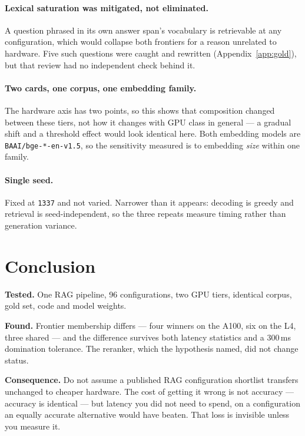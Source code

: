 \paragraph{Lexical saturation was mitigated, not eliminated.} A question phrased
in its own answer span's vocabulary is retrievable at any configuration, which
would collapse both frontiers for a reason unrelated to hardware. Five such
questions were caught and rewritten (Appendix~\ref{app:gold}), but that review
had no independent check behind it.

\paragraph{Two cards, one corpus, one embedding family.} The hardware axis has
two points, so this shows that composition changed between these tiers, not how
it changes with GPU class in general --- a gradual shift and a threshold effect
would look identical here. Both embedding models are \texttt{BAAI/bge-*-en-v1.5},
so the sensitivity measured is to embedding \emph{size} within one family.

\paragraph{Single seed.} Fixed at \texttt{1337} and not varied. Narrower than it
appears: decoding is greedy and retrieval is seed-independent, so the three
repeats measure timing rather than generation variance.

\section{Conclusion}

\textbf{Tested.} One RAG pipeline, 96 configurations, two GPU tiers, identical
corpus, gold set, code and model weights.

\textbf{Found.} Frontier membership differs --- four winners on the A100, six on
the L4, three shared --- and the difference survives both latency statistics and
a 300\,ms domination tolerance. The reranker, which the hypothesis named, did not
change status.

\textbf{Consequence.} Do not assume a published RAG configuration shortlist
transfers unchanged to cheaper hardware. The cost of getting it wrong is not
accuracy --- accuracy is identical --- but latency you did not need to spend, on
a configuration an equally accurate alternative would have beaten. That loss is
invisible unless you measure it.


